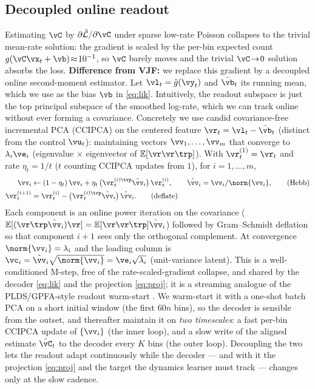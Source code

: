\documentclass[11pt]{article}
\newcommand{\E}{\mathbb{E}}
\begin{document}
\subsection{Decoupled online readout}\label{ssec:readout}
Estimating $\vC$ by $\partial\hat{\mathcal L}/\partial\vC$ under sparse low-rate Poisson collapses
to the trivial mean-rate solution: the gradient is scaled by the per-bin expected count
$g(\vC\vx_t+\vb)\!\approx\!10^{-1}$, so $\vC$ barely moves and the trivial $\vC\!\to\!0$ solution
absorbs the loss. \textbf{Difference from VJF:} we replace this gradient by a decoupled online
second-moment estimator. Let $\vl_t=\tilde g(\vy_t)$ and $\bar\vb_t$ its running mean, which we use
as the bias $\vb$ in \cref{eq:lik}. Intuitively, the readout subspace is just the top principal
subspace of the smoothed log-rate, which we can track online without ever forming a covariance.
Concretely we use candid covariance-free incremental PCA (CCIPCA) \autocite{weng2003candid} on the
centered feature $\vr_t=\vl_t-\bar\vb_t$ (distinct from the control $\vu_t$): maintaining vectors
$\vv_1,\dots,\vv_m$ that converge to $\lambda_i\ve_i$ (eigenvalue $\times$ eigenvector of
$\E[\vr\vr\trp]$). With $\vr_t^{(1)}=\vr_t$ and rate $\eta_t=1/t$ ($t$ counting CCIPCA updates from $1$), for $i=1,\dots,m$,
\begin{align}
  \vv_i &\leftarrow (1-\eta_t)\,\vv_i + \eta_t\,\big(\vr_t^{(i)\trp}\hat\vv_i\big)\,\vr_t^{(i)},
     \qquad \hat\vv_i=\vv_i/\norm{\vv_i}, \tag{Hebb}\label{eq:hebb}\\
  \vr_t^{(i+1)} &= \vr_t^{(i)} - \big(\vr_t^{(i)\trp}\hat\vv_i\big)\,\hat\vv_i. \tag{deflate}\label{eq:deflate}
\end{align}
Each component is an online power iteration on the covariance
($\E[(\vr\trp\hat\vv_i)\vr]=\E[\vr\vr\trp]\hat\vv_i$) followed by Gram--Schmidt deflation so that
component $i{+}1$ sees only the orthogonal complement. At convergence $\norm{\vv_i}=\lambda_i$ and
the loading column is $\vc_i=\hat\vv_i\sqrt{\norm{\vv_i}}=\ve_i\sqrt{\lambda_i}$ (unit-variance
latent). This is a well-conditioned M-step, free of the rate-scaled-gradient collapse, and shared
by the decoder \cref{eq:lik} and the projection \cref{eq:proj}; it is a streaming analogue of the
PLDS/GPFA-style readout warm-start \autocite{macke2011empirical,yu2009gaussian}. We warm-start it
with a one-shot batch PCA on a short initial window (the first $60n$ bins), so the decoder is
sensible from the outset, and thereafter maintain it on \emph{two timescales}: a fast per-bin
CCIPCA update of $\{\vv_i\}$ (the inner loop), and a slow write of the aligned estimate
$\hat\vC_t$ to the decoder every $K$ bins (the outer loop). Decoupling the two lets the readout
adapt continuously while the decoder --- and with it the projection \cref{eq:proj} and the target
the dynamics learner must track --- changes only at the slow cadence.
\end{document}

